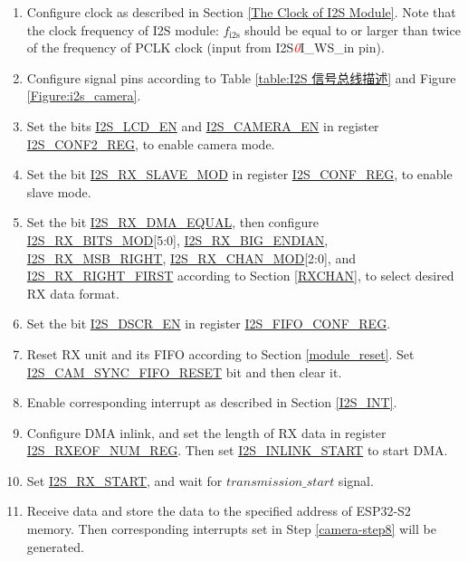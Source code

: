 \documentclass[main\_\_EN.tex]{subfiles}
\begin{document}
\begin{enumerate}
    \item Configure clock as described in Section \ref{The Clock of I2S Module}. Note that the clock frequency of I2S module: $f_{\textrm{i2s}}$ should be equal to or larger than twice of the frequency of PCLK clock (input from I2S\textcolor{red}{\it{0}}I\_WS\_in pin).

    \item Configure signal pins according to Table \ref{table:I2S 信号总线描述} and Figure \ref{Figure:i2s_camera}.

    \item Set the bits \hyperref[fielddesc:I2SLCDEN]{I2S\_LCD\_EN} and \hyperref[fielddesc:I2SCAMERAEN]{I2S\_CAMERA\_EN} in register \hyperref[regdesc:I2SCONF2REG]{I2S\_CONF2\_REG}, to enable camera mode.

    \item Set the bit \hyperref[fielddesc:I2SRXSLAVEMOD]{I2S\_RX\_SLAVE\_MOD} in register \hyperref[regdesc:I2SCONFREG]{I2S\_CONF\_REG}, to enable slave mode.

    \item Set the bit \hyperref[fielddesc:I2SRXDMAEQUAL]{I2S\_RX\_DMA\_EQUAL}, then configure \hyperref[fielddesc:I2SRXBITSMOD]{I2S\_RX\_BITS\_MOD}[5:0], \hyperref[fielddesc:I2SRXBIGENDIAN]{I2S\_RX\_BIG\_ENDIAN}, \hyperref[fielddesc:I2SRXMSBRIGHT]{I2S\_RX\_MSB\_RIGHT}, \hyperref[fielddesc:I2SRXCHANMOD]{I2S\_RX\_CHAN\_MOD}[2:0], and \hyperref[fielddesc:I2SRXRIGHTFIRST]{I2S\_RX\_RIGHT\_FIRST} according to Section \ref{RXCHAN}, to select desired RX data format.

    \item Set the bit \hyperref[fielddesc:I2SDSCREN]{I2S\_DSCR\_EN} in register \hyperref[regdesc:I2SFIFOCONFREG]{I2S\_FIFO\_CONF\_REG}.
    \item Reset RX unit and its FIFO according to Section \ref{module_reset}. Set \hyperref[fielddesc:I2SCAMSYNCFIFORESET]{I2S\_CAM\_SYNC\_FIFO\_RESET} bit and then clear it.
    \item Enable corresponding interrupt as described in Section \ref{I2S_INT}. \label{camera-step8}

    \item Configure DMA inlink, and set the length of RX data in register \hyperref[regdesc:I2SRXEOFNUMREG]{I2S\_RXEOF\_NUM\_REG}. Then set \hyperref[fielddesc:I2SINLINKSTART]{I2S\_INLINK\_START} to start DMA.

    \item Set \hyperref[fielddesc:I2SRXSTART]{I2S\_RX\_START}, and wait for \hyperref[start-signal]{\begin{math}{transmission\_start} \end{math}} signal.

    \item Receive data and store the data to the specified address of ESP32-S2 memory. Then corresponding interrupts set in Step \ref{camera-step8} will be generated.
\end{enumerate}
\end{document}
